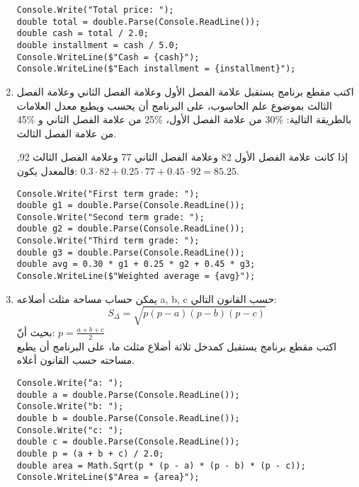 \documentclass[12pt]{article}
\begin{document}
\begin{enumerate}[itemsep=2em]
\ifwithsols
\begin{boxSolution}
\begin{english}
\begin{verbatim}
Console.Write("Total price: ");
double total = double.Parse(Console.ReadLine());
double cash = total / 2.0;
double installment = cash / 5.0;
Console.WriteLine($"Cash = {cash}");
Console.WriteLine($"Each installment = {installment}");
\end{verbatim}
\end{english}
\end{boxSolution}
\clearpage
\fi

    \item
	اكتب مقطع برنامج يستقبل علامة الفصل الأول وعلامة الفصل الثاني وعلامة الفصل الثالث بموضوع علم الحاسوب، على البرنامج أن يحسب ويطبع معدل العلامات بالطريقة التالية:
     \%30 من علامة الفصل الأول، \%25 من علامة الفصل الثاني و \%45 من علامة الفصل الثالث. \\
     \begin{boxExample}
        إذا كانت علامة الفصل الأول 82 وعلامة الفصل الثاني 77 وعلامة الفصل الثالث 92, فالمعدل يكون: $0.3 \cdot 82 + 0.25 \cdot 77 + 0.45 \cdot 92 = 85.25$.
     \end{boxExample}

\ifwithsols
\begin{boxSolution}
\begin{english}
\begin{verbatim}
Console.Write("First term grade: ");
double g1 = double.Parse(Console.ReadLine());
Console.Write("Second term grade: ");
double g2 = double.Parse(Console.ReadLine());
Console.Write("Third term grade: ");
double g3 = double.Parse(Console.ReadLine());
double avg = 0.30 * g1 + 0.25 * g2 + 0.45 * g3;
Console.WriteLine($"Weighted average = {avg}");
\end{verbatim}
\end{english}
\end{boxSolution}
\fi

     \item
	يمكن حساب مساحة مثلث أضلاعه a, b, c حسب القانون التالي:
    $$S_\Delta = \sqrt{p (p-a) (p-b) (p-c)}$$
    بحيث أنّ: $p=\frac{a+b+c}{2}$ \\
اكتب مقطع برنامج يستقبل كمدخل ثلاثة أضلاع مثلث ما، على البرنامج أن يطبع مساحته حسب القانون أعلاه.

\ifwithsols
\begin{boxSolution}
\begin{english}
\begin{verbatim}
Console.Write("a: ");
double a = double.Parse(Console.ReadLine());
Console.Write("b: ");
double b = double.Parse(Console.ReadLine());
Console.Write("c: ");
double c = double.Parse(Console.ReadLine());
double p = (a + b + c) / 2.0;
double area = Math.Sqrt(p * (p - a) * (p - b) * (p - c));
Console.WriteLine($"Area = {area}");
\end{verbatim}
\end{english}
\end{boxSolution}
\clearpage
\fi


\end{enumerate}
\end{document}
